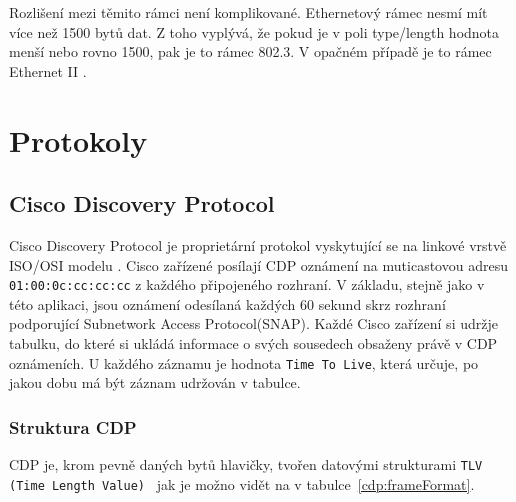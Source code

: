 \documentclass[a4paper,12pt]{article}
\begin{document}
		Rozlišení mezi těmito rámci není komplikované. Ethernetový rámec nesmí mít více než 1500 bytů dat. Z toho vyplývá, že pokud je v poli type/length hodnota menší nebo rovno 1500, pak je to rámec 802.3. V opačném případě je to rámec Ethernet II \cite{wireshark:ethernet}. 
	
	\section{Protokoly}	
		\subsection{Cisco Discovery Protocol}\label{cdp}
			Cisco Discovery Protocol je proprietární protokol vyskytující se na linkové vrstvě \cite{wiki:cdp} ISO/OSI modelu \cite{wiki:iso/osi}. Cisco zařízené posílají CDP oznámení na muticastovou adresu \texttt{01:00:0c:cc:cc:cc} z každého připojeného rozhraní. V základu, stejně jako v této aplikaci, jsou oznámení odesílaná každých 60 sekund skrz rozhraní podporující Subnetwork Access Protocol(SNAP). Každé Cisco zařízení si udržje tabulku, do které si ukládá informace o svých sousedech obsaženy právě v CDP oznámeních. U každého záznamu je hodnota \texttt{Time To Live}, která určuje, po jakou dobu má být záznam udržován v tabulce.
			
			\subsubsection{Struktura CDP}
				CDP je, krom pevně daných bytů hlavičky, tvořen datovými strukturami \texttt{TLV (Time Length Value)}~\cite{technion:cdp} jak je možno vidět na v tabulce~\ref{cdp:frameFormat}.
				
		
				\begin{table}[h]
					\begin{center}
						\caption{Struktura protokolu CDP}\label{cdp:frameFormat}
						
						
						
					\end{center}
				\end{table}
				
\end{document}
